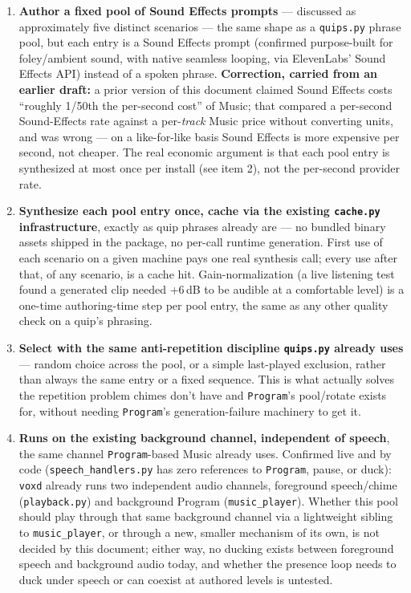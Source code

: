 \documentclass[a4paper,11pt]{report}
\begin{document}
\begin{enumerate}
  \item \textbf{Author a fixed pool of Sound Effects prompts} ---
    discussed as approximately five distinct scenarios --- the same
    shape as a \texttt{quips.py} phrase pool, but each entry is a Sound
    Effects prompt (confirmed purpose-built for foley/ambient sound, with
    native seamless looping, via ElevenLabs' Sound Effects API) instead
    of a spoken phrase. \textbf{Correction, carried from an earlier
    draft:} a prior version of this document claimed Sound Effects costs
    ``roughly 1/50th the per-second cost'' of Music; that compared a
    per-second Sound-Effects rate against a per-\emph{track} Music price
    without converting units, and was wrong --- on a like-for-like basis
    Sound Effects is more expensive per second, not cheaper. The real
    economic argument is that each pool entry is synthesized at most once
    per install (see item 2), not the per-second provider rate.
  \item \textbf{Synthesize each pool entry once, cache via the existing
    \texttt{cache.py} infrastructure}, exactly as quip phrases already
    are --- no bundled binary assets shipped in the package, no
    per-call runtime generation. First use of each scenario on a given
    machine pays one real synthesis call; every use after that, of any
    scenario, is a cache hit. Gain-normalization (a live listening test
    found a generated clip needed +6\,dB to be audible at a comfortable
    level) is a one-time authoring-time step per pool entry, the same as
    any other quality check on a quip's phrasing.
  \item \textbf{Select with the same anti-repetition discipline
    \texttt{quips.py} already uses} --- random choice across the pool,
    or a simple last-played exclusion, rather than always the same entry
    or a fixed sequence. This is what actually solves the repetition
    problem chimes don't have and \texttt{Program}'s pool/rotate exists
    for, without needing \texttt{Program}'s generation-failure machinery
    to get it.
  \item \textbf{Runs on the existing background channel, independent of
    speech}, the same channel \texttt{Program}-based Music already uses.
    Confirmed live and by code (\texttt{speech\_handlers.py} has zero
    references to \texttt{Program}, pause, or duck): \texttt{voxd}
    already runs two independent audio channels, foreground
    speech/chime (\texttt{playback.py}) and background Program
    (\texttt{music\_player}). Whether this pool should play through that
    same background channel via a lightweight sibling to
    \texttt{music\_player}, or through a new, smaller mechanism of its
    own, is not decided by this document; either way, no ducking exists
    between foreground speech and background audio today, and whether
    the presence loop needs to duck under speech or can coexist at
    authored levels is untested.
\end{enumerate}
\end{document}
